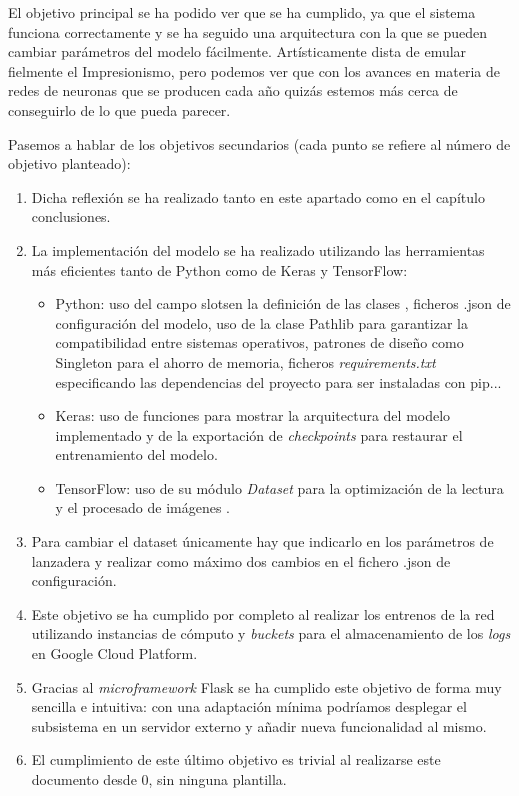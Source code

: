 \documentclass[[../main.tex]{subfiles}
\begin{document}
El objetivo principal se ha podido ver que se ha cumplido, ya que el sistema funciona correctamente y se ha seguido una arquitectura con la que se pueden cambiar parámetros del modelo fácilmente. Artísticamente dista de emular fielmente el Impresionismo, pero podemos ver que con los avances en materia de redes de neuronas que se producen cada año quizás estemos más cerca de conseguirlo de lo que pueda parecer. \newline

Pasemos a hablar de los objetivos secundarios (cada punto se refiere al número de objetivo planteado):

\begin{enumerate}
    \item Dicha reflexión se ha realizado tanto en este apartado como en el capítulo conclusiones. 
    \item La implementación del modelo se ha realizado utilizando las herramientas más eficientes tanto de Python como de Keras y TensorFlow: 
        \begin{itemize}
            \item Python: uso del campo \textunderscore \textunderscore slots\textunderscore \textunderscore en la definición de las clases \cite{Chazallet}, ficheros .json de configuración del modelo, uso de la clase Pathlib para garantizar la compatibilidad entre sistemas operativos, patrones de diseño como Singleton para el ahorro de memoria, ficheros \textit{requirements.txt} especificando las dependencias del proyecto para ser instaladas con pip...
            \item Keras: uso de funciones para mostrar la arquitectura del modelo implementado y de la exportación de \textit{checkpoints} para restaurar el entrenamiento del modelo.
            \item TensorFlow: uso de su módulo \textit{Dataset} para la optimización de la lectura y el procesado de imágenes \cite{TensorFlow_Dataset}.
        \end{itemize}
   \item Para cambiar el dataset únicamente hay que indicarlo en los parámetros de lanzadera y realizar como máximo dos cambios en el fichero .json de configuración.
   \item Este objetivo se ha cumplido por completo al realizar los entrenos de la red utilizando instancias de cómputo y \textit{buckets} para el almacenamiento de los \textit{logs} en Google Cloud Platform.
   \item Gracias al \textit{microframework} Flask se ha cumplido este objetivo de forma muy sencilla e intuitiva: con una adaptación mínima podríamos desplegar el subsistema en un servidor externo y añadir nueva funcionalidad al mismo.
   \item El cumplimiento de este último objetivo es trivial al realizarse este documento desde 0, sin ninguna plantilla.
\end{enumerate}
\end{document}
